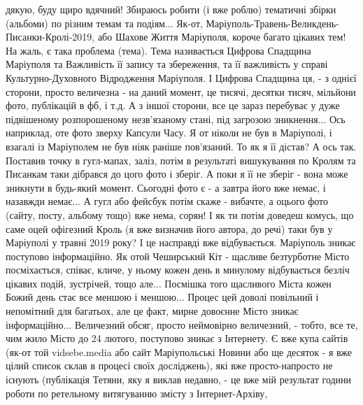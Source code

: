  
 
 
 
 

дякую, буду щиро вдячний! Збираюсь робити (і вже роблю) тематичні збірки
(альбоми) по різним темам та подіям... Як-от,
Маріуполь-Травень-Великдень-Писанки-Кролі-2019, або Шахове Життя Маріуполя,
короче багато цікавих тем!  На жаль, є така проблема (тема). Тема називається
Цифрова Спадщина Маріуполя та Важливість її запису та збереження, та її
важливість у справі Культурно-Духовного Відродження Маріуполя.  І Цифрова Спадщина ця, -   
з однієї  сторони, просто величезна - на даний момент, це тисячі, десятки
тисяч, мільйони фото, публікацій в фб, і т.д. А з іншої сторони, все це зараз
перебуває у дуже підвішеному розпорошеному незв'язаному стані, під загрозою
зникнення... Ось наприклад, оте фото зверху Капсули Часу. Я от ніколи не був в
Маріуполі, і взагалі із Маріуполем не був ніяк раніше пов'язаний.  То як я її
дістав? А ось так. Поставив точку в гугл-мапах, заліз, потім в результаті
вишукування по Кролям та Писанкам таки дібрався до цого фото і зберіг.  А поки
я її не зберіг - вона може зникнути в будь-який момент. Сьогодні фото є - а
завтра його вже немає, і назавжди немає... А гугл або фейсбук потім скаже -
вибачте, а оцього фото (сайту, посту, альбому тощо) вже нема, сорян!  І як ти
потім доведеш комусь, що саме оцей офігезний Кроль (я вже визначив його автора,
до речі) таки був у Маріуполі у травні 2019 року? І це насправді вже
відбувається. Маріуполь зникає поступово інформаційно. Як отой Чеширський Кіт -
щасливе безтурботне Місто посміхається, співає, кличе, у ньому кожен день в
минулому відбувається безліч цікавих подій, зустрічей, тощо але... Посмішка
того щасливого Міста кожен Божий день стає все меншою і меншою...  Процес цей
доволі повільний і непомітний для багатьох, але це факт, мирне довоєнне Місто
зникає інформаційно...  Величезний обсяг, просто неймовірно величезний,  -
тобто, все те, чим жило Місто до 24 лютого, поступово зникає з Інтернету.  Є
вже купа сайтів (як-от той vidsebe.media або сайт Маріупольські Новини або ще
десяток - я вже цілий список склав в процесі своїх досліджень), які вже
просто-напросто не існують (публікація Тетяни, яку я виклав недавно, - це вже
мій результат години роботи по ретельному витягуванню змісту з Інтернет-Архіву,
